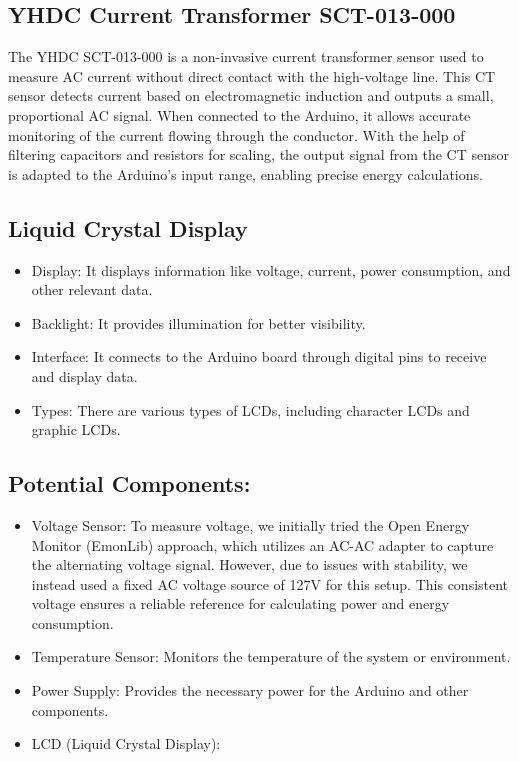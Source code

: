 \subsection{YHDC Current Transformer SCT-013-000}

The YHDC SCT-013-000 is a non-invasive current transformer sensor used to measure AC current without direct contact with the high-voltage line. This CT sensor detects current based on electromagnetic induction and outputs a small, proportional AC signal. When connected to the Arduino, it allows accurate monitoring of the current flowing through the conductor. With the help of filtering capacitors and resistors for scaling, the output signal from the CT sensor is adapted to the Arduino’s input range, enabling precise energy calculations. \cite{OpenEnergyMonitor_Arduino}

\subsection{Liquid Crystal Display}
\begin{itemize}
    \item Display: It displays information like voltage, current, power consumption, and other relevant data. \cite{techtarget_lcd}
    \item Backlight: It provides illumination for better visibility. \cite{techtarget_lcd}
    \item Interface: It connects to the Arduino board through digital pins to receive and display data.
    \item Types: There are various types of LCDs, including character LCDs and graphic LCDs.
\end{itemize}

\subsection{ Potential Components:}
\begin{itemize}
    \item Voltage Sensor: To measure voltage, we initially tried the Open Energy Monitor (EmonLib) approach, which utilizes an AC-AC adapter to capture the alternating voltage signal. However, due to issues with stability, we instead used a fixed AC voltage source of 127V for this setup. This consistent voltage ensures a reliable reference for calculating power and energy consumption.
    \item Temperature Sensor: Monitors the temperature of the system or environment.
    \item Power Supply: Provides the necessary power for the Arduino and other components.
    \item LCD (Liquid Crystal Display):
\end{itemize}


